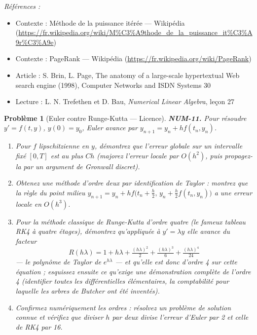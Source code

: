 \documentclass[11pt]{article}
\newtheorem{problem}{Problème}
\newenvironment{refs}{\par\small\noindent\emph{Références :}\begin{itemize}\setlength\itemsep{0pt}}{\end{itemize}\normalsize}
\begin{document}
\begin{refs}
\item Contexte : Méthode de la puissance itérée --- Wikipédia (\url{https://fr.wikipedia.org/wiki/M%C3%A9thode_de_la_puissance_it%C3%A9r%C3%A9e})
\item Contexte : PageRank --- Wikipédia (\url{https://fr.wikipedia.org/wiki/PageRank})
\item Article : S. Brin, L. Page, \og{} The anatomy of a large-scale hypertextual Web search engine \fg{} (1998), Computer Networks and ISDN Systems 30
\item Lecture : L. N. Trefethen et D. Bau, \textit{Numerical Linear Algebra}, leçon 27
\end{refs}

\bigskip

\begin{problem}[{Euler contre Runge-Kutta --- Licence}]
\textbf{NUM-11.} Pour résoudre $y' = f(t,y)$, $y(0) = y_0$,
Euler avance par $y_{n+1} = y_n + h f(t_n, y_n)$.
\begin{enumerate}
\item[(a)] Pour $f$ lipschitzienne en
$y$, démontrez que l'erreur globale sur un intervalle fixé $[0,T]$ est au plus
$C h$ (majorez l'erreur locale par $O(h^2)$, puis propagez-la par un argument de
Gronwall discret).
\item[(b)] Obtenez une méthode d'ordre deux par identification de Taylor : montrez que la
règle du point milieu
$y_{n+1} = y_n + h f\big(t_n + \tfrac{h}{2},\, y_n + \tfrac{h}{2} f(t_n,y_n)\big)$
a une erreur locale en $O(h^3)$.
\item[(c)] Pour la méthode classique de Runge-Kutta d'ordre quatre
(le fameux tableau RK4 à quatre étages), démontrez qu'appliquée à $y' = \lambda y$
elle avance du facteur
\[ R(h\lambda) = 1 + h\lambda + \tfrac{(h\lambda)^2}{2} + \tfrac{(h\lambda)^3}{6}
+ \tfrac{(h\lambda)^4}{24} \]
--- le polynôme de Taylor de $e^{h\lambda}$ --- et qu'elle est donc d'ordre 4 sur cette
équation ; esquissez ensuite ce qu'exige une démonstration complète de l'ordre 4
(identifier toutes les différentielles élémentaires, la comptabilité pour laquelle les
arbres de Butcher ont été inventés).
\item[(d)] Confirmez numériquement les
ordres : résolvez un problème de solution connue et vérifiez que diviser $h$ par
deux divise l'erreur d'Euler par 2 et celle de RK4 par 16.
\end{enumerate}

\end{problem}
\end{document}
